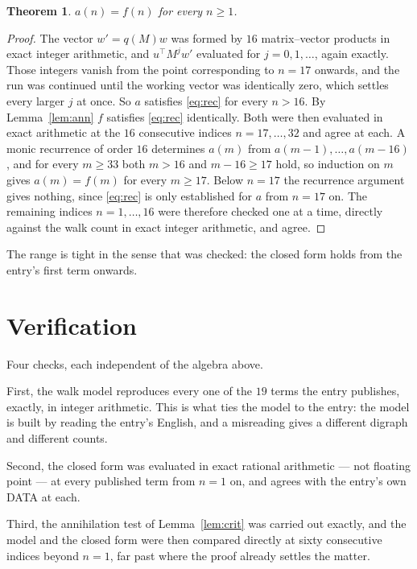 \documentclass[11pt,a4paper]{article}
\theoremstyle{plain}
\newtheorem{theorem}{Theorem}
\theoremstyle{definition}
\begin{document}
\begin{theorem}
$a(n)=f(n)$ for every $n\ge1$.
\end{theorem}

\begin{proof}
The vector $w'=q(M)w$ was formed by $16$ matrix--vector products in exact integer
arithmetic, and $u^{\!\top}M^{j}w'$ evaluated for $j=0,1,\dots$, again exactly. Those integers
vanish from the point corresponding to $n=17$ onwards, and the run was continued until the
working vector was identically zero, which settles every larger $j$ at once. So $a$ satisfies
\eqref{eq:rec} for every $n>16$. By Lemma~\ref{lem:ann} $f$ satisfies \eqref{eq:rec}
identically. Both were then evaluated in exact arithmetic at the $16$ consecutive indices
$n=17,\dots,32$ and agree at each. A monic recurrence of order $16$
determines $a(m)$ from $a(m-1),\dots,a(m-16)$, and for every $m\ge33$ both
$m>16$ and $m-16\ge17$ hold, so induction on $m$ gives $a(m)=f(m)$ for every
$m\ge17$.
Below $n=17$ the recurrence argument gives nothing, since \eqref{eq:rec} is only
established for $a$ from $n=17$ on. The remaining indices $n=1,\dots,16$ were
therefore checked one at a time, directly against the walk count in exact integer arithmetic,
and agree.
\end{proof}

The range is tight in the sense that was checked: the closed form holds from the entry's first term onwards.

\section{Verification}

Four checks, each independent of the algebra above.

First, the walk model reproduces every one of the $19$ terms the entry publishes,
exactly, in integer arithmetic. This is what ties the model to the entry: the model is built
by reading the entry's English, and a misreading gives a different digraph and different
counts.

Second, the closed form was evaluated in exact rational arithmetic --- not floating point ---
at every published term from $n=1$ on, and agrees with the entry's own DATA at each.

Third, the annihilation test of Lemma~\ref{lem:crit} was carried out exactly, and the model
and the closed form were then compared directly at sixty consecutive indices beyond
$n=1$, far past where the proof already settles the matter.
\end{document}
